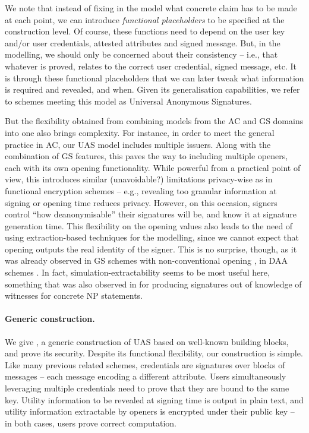 We note that instead of fixing in the model what concrete claim has to
be made at each point, we can introduce \emph{functional placeholders} to be
specified at the construction level. Of course, these functions need
to depend on the user key and/or user credentials, attested attributes and
signed message. But, in the modelling, we should only be concerned about their
consistency -- i.e., that whatever is proved, relates to the correct user
credential, signed message, etc.
%
It is through these functional placeholders that we can later tweak what
information is required and revealed, and when. Given its generalisation
capabilities, we refer to schemes meeting this model as Universal Anonymous
Signatures.

But the flexibility obtained from combining models from the AC and GS
domains into one also brings complexity. For instance, in order to meet
the general practice in AC, our UAS model includes multiple issuers. Along with
the combination of GS features, this paves the way to including multiple
openers, each with its own opening functionality. While powerful from a
practical point of view, this introduces similar (unavoidable?) limitations
privacy-wise as in functional encryption schemes \cite{bsw11} -- e.g., revealing
too granular information at signing or opening time reduces privacy. However, on
this occasion, signers control ``how deanonymisable'' their signatures will
be, and know it at signature generation time. This flexibility on the opening
values also leads to the need of using extraction-based techniques for the
modelling, since we cannot expect that opening outputs the real identity of the
signer. This is no surprise, though, as it was already observed in GS schemes
with non-conventional opening \cite{dl21}, in DAA schemes \cite{cdl16,cdl16b}.
In fact, simulation-extractability seems to be most useful here, something that
was also observed in \cite{cl06} for producing signatures out of knowledge of
witnesses for concrete NP statements.

\paragraph{Generic construction.} %
We give \CUASGen, a generic construction of UAS based on well-known
building blocks, and prove its security. Despite its functional flexibility, our
construction is simple. Like many previous related schemes, credentials are
signatures over blocks of messages -- each message encoding a different
attribute. Users simultaneously leveraging multiple credentials need to prove
that they are bound to the same key. Utility information to be revealed at
signing time is output in plain text, and utility information extractable by
openers is encrypted under their public key -- in both cases, users prove
correct computation.

